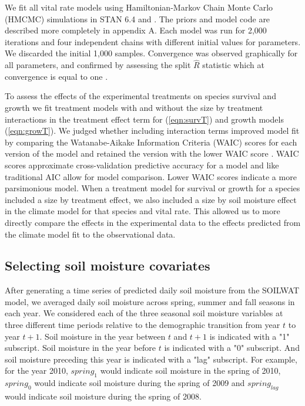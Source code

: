 \documentclass[11pt]{article}
\begin{document}
\begin{doublespacing}
We fit all vital rate models using Hamiltonian-Markov Chain Monte Carlo (HMCMC) simulations in STAN 6.4 \citep{stan} and  \citep{rstan}. The priors and model code are described more completely in appendix A. Each model was run for 2,000 iterations and four independent chains with different initial values for parameters. We discarded the initial 1,000 samples. Convergence was observed graphically for all parameters, and confirmed by assessing the split $\widehat{R}$ statistic which at convergence is equal to one \citep{stan manual}. 

To assess the effects of the experimental treatments on species survival and growth we fit treatment models with and without the size by treatment interactions in the treatment effect term for (\ref{eqn:survT}) and growth models (\ref{eqn:growT}). We judged whether including interaction terms improved model fit by comparing the Watanabe-Aikake Information Criteria (WAIC) scores for each version of the model and retained the version with the lower WAIC score \citep{vetari_practical_2015}. WAIC scores approximate cross-validation predictive accuracy for a model and like traditional AIC allow for model comparison. Lower WAIC scores indicate a more parsimonious model. When a treatment model for survival or growth for a species included a size by treatment effect, we also included a size by soil moisture effect in the climate model for that species and vital rate. This allowed us to more directly compare the effects in the experimental data to the effects predicted from the climate model fit to the observational data.

\subsection*{Selecting soil moisture covariates}

After generating a time series of predicted daily soil moisture from the SOILWAT model, we averaged daily soil moisture across spring, summer and fall seasons in each year. We considered each of the three seasonal soil moisture variables at three different time periods relative to the demographic transition from year $t$ to year $t+1$.  Soil moisture in the year between $t$ and $t+1$ is indicated with a "1" subscript.  Soil moisture in the year before $t$ is indicated with a "0" subscript. And soil moisture preceding this year is indicated with a "lag" subscript. For example, for the year 2010, $spring_1$ would indicate soil moisture in the spring of 2010, $spring_0$ would indicate soil moisture during the spring of 2009 and $spring_{lag}$ would indicate soil moisture during the spring of 2008.   


\end{doublespacing}
\end{document}
